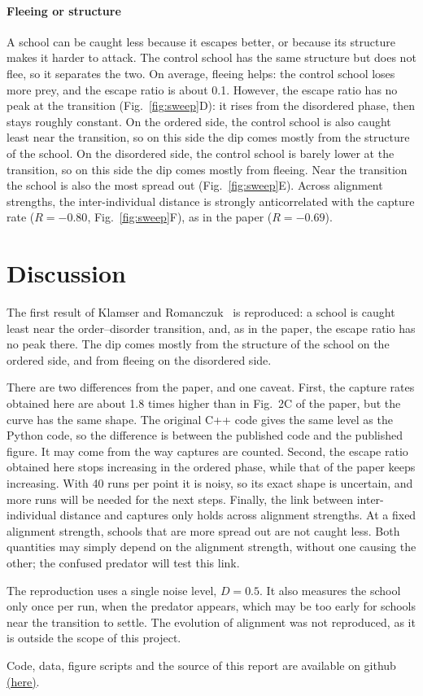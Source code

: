 \documentclass[9pt,twoside]{pnas-new}
\begin{document}
\paragraph*{Fleeing or structure}
A school can be caught less because it escapes better, or because its structure makes it harder to
attack. The control school has the same structure but does not flee, so it separates the two. On average, fleeing helps: the control school loses more prey, and the escape ratio is about
0.1. However, the escape ratio has no peak at the transition (Fig.~\ref{fig:sweep}D): it rises from the disordered phase, then stays roughly constant. On the ordered side, the control school is also caught least near
the transition, so on this side the dip comes mostly from the structure of the school. On the disordered side, the control school is barely lower at the transition, so on this side the
dip comes mostly from fleeing. Near the transition the school is also the most spread out
(Fig.~\ref{fig:sweep}E). Across alignment strengths, the inter-individual distance is strongly
anticorrelated with the capture rate ($R = -0.80$, Fig.~\ref{fig:sweep}F), as in the paper
($R = -0.69$).

\section*{Discussion}

The first result of Klamser and Romanczuk~\cite{klamser2021} is reproduced: a school is caught least
near the order--disorder transition, and, as in the paper, the escape ratio has no peak there. The dip comes mostly from the structure of
the school on the ordered side, and from fleeing on the disordered side.

There are two differences from the paper, and one caveat. First, the capture rates obtained here are
about 1.8 times higher than in Fig.~2C of the paper, but the curve has the same shape. The original
C++ code gives the same level as the Python code, so the difference is between the published code and the
published figure. It may come from the way captures are counted. Second, the escape ratio obtained here stops
increasing in the ordered phase, while that of the paper keeps increasing. With 40 runs per point
it is noisy, so its exact shape is uncertain, and more runs will be needed for the next steps. Finally, the link between inter-individual distance and
captures only holds across alignment strengths. At a fixed alignment strength, schools that are more
spread out are not caught less. Both quantities may simply depend on the alignment strength, without
one causing the other; the confused predator will test this link.

The reproduction uses a single noise level, $D = 0.5$. It also measures the school only once per run,
when the predator appears, which may be too early for schools near the transition to settle. The evolution of alignment was not reproduced, as it is outside the scope of this project.



Code, data, figure scripts and the source of this report are available on github 
\href{https://github.com/mathieusharp/fish-school-predator-dynamics}{(here)}.


\end{document}
